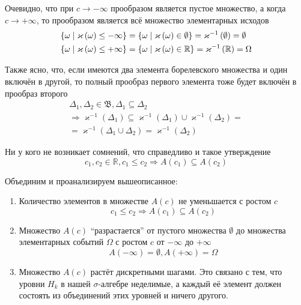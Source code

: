 Очевидно, что при $c\to-\infty$ прообразом является пустое множество,
а когда $c\to+\infty$, то прообразом является всё множество элементарных исходов
\begin{align*}
  \left\{ \omega \;\middle|\; \varkappa\left( \omega \right) \le -\infty \right\}
      &= \left\{ \omega \;\middle|\; \varkappa\left(\omega\right)\in\emptyset \right\}
      = \varkappa^{-1}\left( \emptyset \right)
      = \emptyset \\
  \left\{ \omega \;\middle|\; \varkappa\left( \omega \right) \le +\infty \right\}
      &= \left\{ \omega \;\middle|\;\varkappa\left(\omega\right)\in\mathbb{R} \right\}
      = \varkappa^{-1}\left( \mathbb{R} \right)
      = \Omega
\end{align*}

Также ясно,
что, если имеются два элемента борелевского множества и один включён в другой,
то полный прообраз первого элемента тоже будет включён в прообраз второго
\begin{align*}
  \Delta_1, \Delta_2 \in \mathfrak{B},
  \Delta_1 \subseteq \Delta_2 \\
  \Rightarrow \varkappa^{-1}\left( \Delta_1 \right)
      \subseteq \varkappa^{-1}\left( \Delta_1 \right)
      \cup \varkappa^{-1}\left( \Delta_2 \right) = \\
      = \varkappa^{-1}\left( \Delta_1 \cup \Delta_2 \right)
      = \varkappa^{-1}\left( \Delta_2 \right)
\end{align*}

Ни у кого не возникает сомнений, что справедливо и такое утверждение
$$c_1, c_2 \in \mathbb{R}, c_1 \le c_2
  \Rightarrow A\left( c_1 \right) \subseteq A\left( c_2 \right)$$

Объединим и проанализируем вышеописанное:
\begin{enumerate}
  \item Количество элементов в множестве $A\left( c \right)$
      не уменьшается с ростом $c$
      $$c_1 \le c_2
      \Rightarrow A\left( c_1 \right) \subseteq A\left( c_2 \right)$$

  \item Множество $A\left( c \right)$ ``разрастается''
      от пустого множества $\emptyset$
      до множества элементарных событий $\Omega$
      с ростом $c$ от $-\infty$ до $+\infty$
      $$A\left( -\infty \right)=\emptyset, A\left( +\infty \right)=\Omega$$

  \item Множество $A\left( c \right)$ растёт дискретными шагами.
      Это связано с тем, что уровни $H_k$ в нашей $\sigma$-алгебре неделимые,
      а каждый её элемент должен состоять из
      объединений этих уровней и ничего другого.
\end{enumerate}

